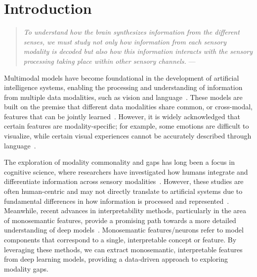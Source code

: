 



\section{Introduction}
\begin{quote}
    \emph{To understand how the brain synthesizes information from the different senses, we must study not only how information from each sensory modality is decoded but also how this information interacts with the sensory processing taking place within other sensory channels.} --- \citet{calvert2004handbook}
\end{quote}

Multimodal models have become foundational in the development of artificial intelligence systems, enabling the processing and understanding of information from multiple data modalities, such as vision and language~\citep{radford2021learning, kim2021vilt, lu2019vilbert,liang2024foundations}. These models are built on the premise that different data modalities share common, or cross-modal, features that can be jointly learned~\citep{ngiam2011multimodal}. However, it is widely acknowledged that certain features are modality-specific; for example, some emotions are difficult to visualize, while certain visual experiences cannot be accurately described through language~\citep{paivio1991dual}.

The exploration of modality commonality and gaps has long been a focus in cognitive science, where researchers have investigated how humans integrate and differentiate information across sensory modalities~\citep{spence2011crossmodal}. However, these studies are often human-centric and may not directly translate to artificial systems due to fundamental differences in how information is processed and represented~\citep{calvert2004handbook}. Meanwhile, recent advances in interpretability methods, particularly in the area of monosemantic features, provide a promising path towards a more detailed understanding of deep models~\citep{elhage2022solu,bills2023language,Gurnee2023FindingNI,Yan2024EncourageOI}. Monosemantic features/neurons refer to model components that correspond to a single, interpretable concept or feature. By leveraging these methods, we can extract monosemantic, interpretable features from deep learning models, providing a data-driven approach to exploring modality gaps.

